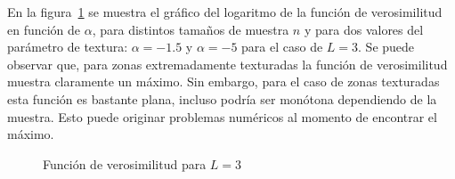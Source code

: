 En la figura~\ref{MV} se muestra el gráfico del logaritmo de la función de verosimilitud en función de $\alpha$, para distintos tamaños de muestra $n$ y para dos valores del parámetro de textura: $\alpha=-1.5$ y $\alpha=-5$ para el caso de $L=3$. Se puede observar que, para zonas extremadamente texturadas la función de verosimilitud muestra claramente un máximo. Sin embargo, para el caso de zonas texturadas esta función es bastante plana, incluso podría ser monótona dependiendo de la muestra. Esto puede originar problemas numéricos al momento de encontrar el máximo.  

\begin{figure}[hbt]
	\centering    
	\label{MV}
	\caption{Función de verosimilitud para $L=3$}
\end{figure}

